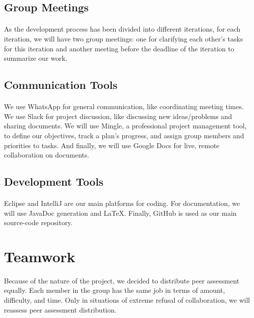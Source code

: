\documentclass[11pt, a4paper]{article}
\begin{document}
\subsection{Group Meetings}\label{gm}
\paragraph{}
As the development process has been divided into different iterations, for each iteration, we will have two group meetings: one for clarifying each other's tasks for this iteration and another meeting before the deadline of the iteration to summarize our work.

\subsection{Communication Tools}\label{comm:tools}
\paragraph{}
We use WhatsApp for general communication, like coordinating meeting times. We use Slack for project discussion, like discussing new ideas/problems and sharing documents. We will use Mingle, a professional project management tool, to define our objectives, track a plan's progress, and assign group members and priorities to tasks. And finally, we will use Google Docs for live, remote collaboration on documents.
\subsection{Development Tools}\label{dev:tools}
\paragraph{}
Eclipse and IntelliJ are our main platforms for coding. For documentation, we will use JavaDoc generation and LaTeX. Finally, GitHub is used as our main source-code repository.

\section{Teamwork}\label{team}
\paragraph{}
Because of the nature of the project, we decided to distribute peer assessment equally. Each member in the group has the same job in terms of amount, difficulty, and time. Only in situations of extreme refusal of collaboration, we will reassess peer assessment distribution.
\end{document}
